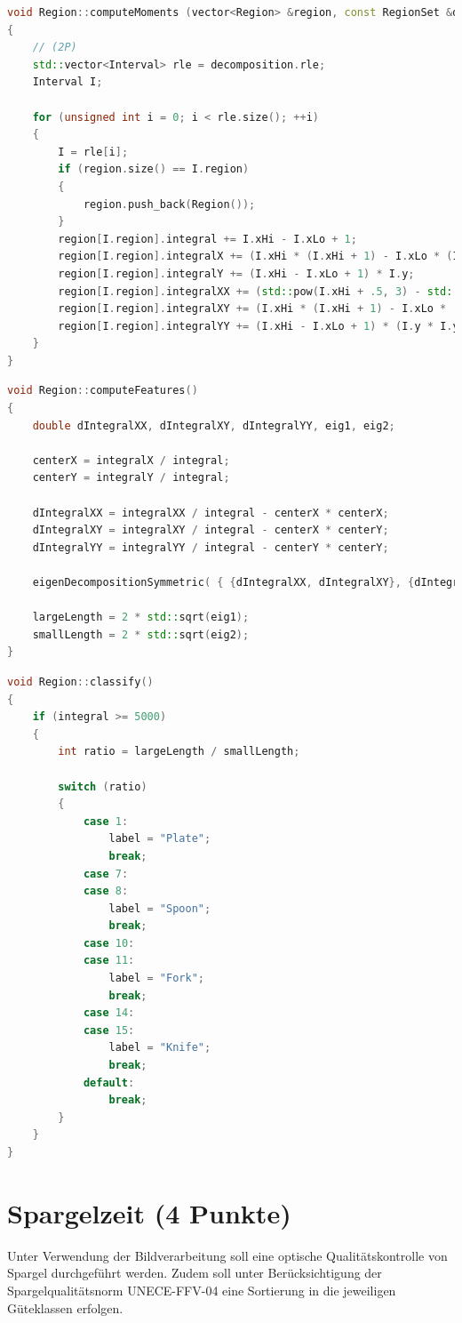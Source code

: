 \documentclass{ezb}
\begin{document}
\begin{lstlisting}[language=C++, caption=Auxiliary routine for group regions]
void Region::computeMoments (vector<Region> &region, const RegionSet &decomposition)
{
	// (2P)
	std::vector<Interval> rle = decomposition.rle;
	Interval I;
	
	for (unsigned int i = 0; i < rle.size(); ++i)
	{
		I = rle[i];
		if (region.size() == I.region)
		{
			region.push_back(Region());
		}
		region[I.region].integral += I.xHi - I.xLo + 1;
		region[I.region].integralX += (I.xHi * (I.xHi + 1) - I.xLo * (I.xLo - 1)) * .5;
		region[I.region].integralY += (I.xHi - I.xLo + 1) * I.y;
		region[I.region].integralXX += (std::pow(I.xHi + .5, 3) - std::pow(I.xLo - .5, 3)) / 3.0;
		region[I.region].integralXY += (I.xHi * (I.xHi + 1) - I.xLo * (I.xLo - 1)) * I.y * .5;
		region[I.region].integralYY += (I.xHi - I.xLo + 1) * (I.y * I.y + 1.0 / 12.0);
	}
}
\end{lstlisting}
\newpage
\begin{lstlisting}[language=C++, caption=Compute center and inertial axes from the second order moments]
void Region::computeFeatures()
{
	double dIntegralXX, dIntegralXY, dIntegralYY, eig1, eig2;

	centerX = integralX / integral;
	centerY = integralY / integral;

	dIntegralXX = integralXX / integral - centerX * centerX;
	dIntegralXY = integralXY / integral - centerX * centerY;
	dIntegralYY = integralYY / integral - centerY * centerY;

	eigenDecompositionSymmetric( { {dIntegralXX, dIntegralXY}, {dIntegralXY, dIntegralYY} }, mainAxis, eig1, eig2);

	largeLength = 2 * std::sqrt(eig1);
	smallLength = 2 * std::sqrt(eig2);
}
\end{lstlisting}

\begin{lstlisting}[language=C++, caption=Determine label from area and inertial axes]
void Region::classify()
{
	if (integral >= 5000)
	{
		int ratio = largeLength / smallLength;

		switch (ratio)
		{
			case 1:
				label = "Plate";
				break;
			case 7:
			case 8:
				label = "Spoon";
				break;
			case 10:
			case 11:
				label = "Fork";
				break;
			case 14:
			case 15:
				label = "Knife";
				break;
			default:
				break;
		}
	}
}
\end{lstlisting}

\newpage
\section{Spargelzeit (4 Punkte)}
Unter Verwendung der Bildverarbeitung soll eine optische Qualitätskontrolle von Spargel durchgeführt werden. Zudem soll unter Berücksichtigung der Spargelqualitätsnorm UNECE-FFV-04 eine Sortierung in die jeweiligen Güteklassen erfolgen.
\end{document}
